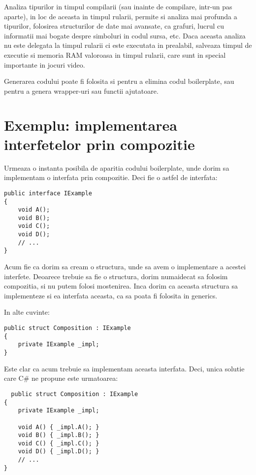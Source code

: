 \documentclass{report}
\begin{document}
Analiza tipurilor in timpul compilarii (sau inainte de compilare,
intr-un pas aparte), in loc de aceasta in timpul rularii, permite si
analiza mai profunda a tipurilor, folosirea structurilor de date mai
avansate, ca grafuri, lucrul cu informatii mai bogate despre simboluri
in codul sursa, etc. Daca aceasta analiza nu este delegata la timpul
rularii ci este executata in prealabil, salveaza timpul de executie si
memoria RAM valoroasa in timpul rularii, care sunt in special importante
in jocuri video.

Generarea codului poate fi folosita si pentru a elimina codul
boilerplate, sau pentru a genera wrapper-uri sau functii ajutatoare.

\section{Exemplu: implementarea interfetelor prin compozitie}

Urmeaza o instanta posibila de aparitia codului boilerplate, unde dorim
sa implementam o interfata prin compozitie. Deci fie o astfel de
interfata:

\begin{lstlisting}
public interface IExample
{
    void A();
    void B();
    void C();
    void D();
    // ...
}
\end{lstlisting}

Acum fie ca dorim sa cream o structura, unde sa avem o implementare a
acestei interfete. Deoarece trebuie sa fie o structura, dorim numaidecat
sa folosim compozitia, si nu putem folosi mostenirea. Inca dorim ca
aceasta structura sa implementeze si ea interfata aceasta, ca sa poata
fi folosita in generics.

In alte cuvinte:

\begin{lstlisting}
public struct Composition : IExample
{
    private IExample _impl;
}
\end{lstlisting}

Este clar ca acum trebuie sa implementam aceasta interfata. Deci, unica
solutie care C\# ne propune este urmatoarea:

\begin{lstlisting}
  public struct Composition : IExample
{
    private IExample _impl;

    void A() { _impl.A(); }
    void B() { _impl.B(); }
    void C() { _impl.C(); }
    void D() { _impl.D(); }
    // ...
}
\end{lstlisting}
\end{document}
